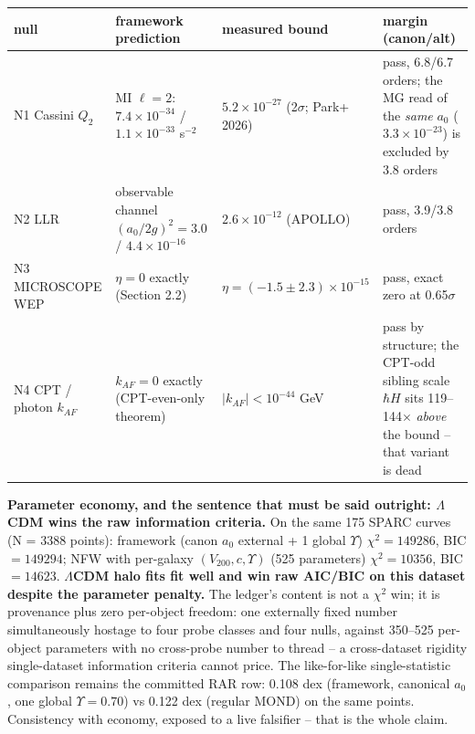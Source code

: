 \documentclass[
]{article}
\newcounter{none} %
\begin{document}
{\def\LTcaptype{none} %
\begin{longtable}[]{@{}
  >{\raggedright\arraybackslash}p{}
  >{\raggedright\arraybackslash}p{}
  >{\raggedright\arraybackslash}p{}
  >{\raggedright\arraybackslash}p{}@{}}
\toprule\noalign{}
\begin{minipage}[b]{\linewidth}\raggedright
null
\end{minipage} & \begin{minipage}[b]{\linewidth}\raggedright
framework prediction
\end{minipage} & \begin{minipage}[b]{\linewidth}\raggedright
measured bound
\end{minipage} & \begin{minipage}[b]{\linewidth}\raggedright
margin (canon/alt)
\end{minipage} \\
\midrule\noalign{}
\endhead
\bottomrule\noalign{}
\endlastfoot
N1 Cassini \(Q_2\) & MI \(\ell{=}2\): \(7.4 \times 10^{-34}\) /
\(1.1 \times 10^{-33}\) s\(^{-2}\) & \(5.2 \times 10^{-27}\)
(2\(\sigma\); Park+ 2026) & pass, 6.8/6.7 orders; the MG read of the
\emph{same} \(a_0\) (\(3.3 \times 10^{-23}\)) is excluded by 3.8
orders \\
N2 LLR & observable channel \((a_0/2g)^2 = 3.0\) /
\(4.4 \times 10^{-16}\) & \(2.6 \times 10^{-12}\) (APOLLO) & pass,
3.9/3.8 orders \\
N3 MICROSCOPE WEP & \(\eta = 0\) exactly (Section 2.2) &
\(\eta = (-1.5 \pm 2.3) \times 10^{-15}\) & pass, exact zero at
0.65\(\sigma\) \\
N4 CPT / photon \(k_{AF}\) & \(k_{AF} = 0\) exactly (CPT-even-only
theorem) & \(|k_{AF}| < 10^{-44}\) GeV & pass by structure; the CPT-odd
sibling scale \(\hbar H\) sits 119--144\(\times\) \emph{above} the bound
-- that variant is dead \\
\end{longtable}
}

\textbf{Parameter economy, and the sentence that must be said outright:
\(\Lambda\)CDM wins the raw information criteria.} On the same 175 SPARC
curves (N = 3388 points): framework (canon \(a_0\) external + 1 global
\(\Upsilon\)) \(\chi^2 = 149286\), BIC \(= 149294\); NFW with per-galaxy
\((V_{200}, c, \Upsilon)\) (525 parameters) \(\chi^2 = 10356\), BIC
\(= 14623\). \textbf{\(\Lambda\)CDM halo fits fit well and win raw
AIC/BIC on this dataset despite the parameter penalty.} The ledger's
content is not a \(\chi^2\) win; it is provenance plus zero per-object
freedom: one externally fixed number simultaneously hostage to four
probe classes and four nulls, against 350--525 per-object parameters
with no cross-probe number to thread -- a cross-dataset rigidity
single-dataset information criteria cannot price. The like-for-like
single-statistic comparison remains the committed RAR row: 0.108 dex
(framework, canonical \(a_0\), one global \(\Upsilon = 0.70\)) vs 0.122
dex (regular MOND) on the same points. Consistency with economy, exposed
to a live falsifier -- that is the whole claim.
\end{document}
